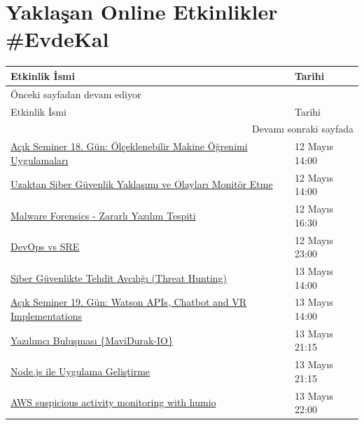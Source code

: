 \documentclass[11pt]{article}
\begin{document}
\section{Yaklaşan Online Etkinlikler \#EvdeKal}
\label{sec:org357459d}
\begin{longtable}{|p{9.5cm}|l|}
\hline
Etkinlik İsmi & Tarihi\\
\hline
\endfirsthead
\multicolumn{2}{l}{Önceki sayfadan devam ediyor} \\
\hline

Etkinlik İsmi & Tarihi \\

\hline
\endhead
\hline\multicolumn{2}{r}{Devamı sonraki sayfada} \\
\endfoot
\endlastfoot
\hline
\href{https://kommunity.com/tracikkaynak/events/acik-seminer-18-gun-olceklenebilir-makine-ogrenimi-uygulamalari-621dca47}{Açık Seminer 18. Gün: Ölçeklenebilir Makine Öğrenimi Uygulamaları} & 12 Mayıs 14:00\\
\href{https://kommunity.com/cozumpark/events/uzaktan-siber-guvenlik-yaklasimi-ve-olaylari-monitor-etme-c989475b}{Uzaktan Siber Güvenlik Yaklaşımı ve Olayları Monitör Etme} & 12 Mayıs 14:00\\
\href{https://kommunity.com/akademi/events/malware-forensics-zararli-yazilim-tespiti-webinar-dc4a41a9}{Malware Forensics - Zararlı Yazılım Tespiti} & 12 Mayıs 16:30\\
\href{https://kommunity.com/cloud-and-serverless-turkey/events/ramazan-ozel-6-devops-vs-sre-41220ba0}{DevOps vs SRE} & 12 Mayıs 23:00\\
\href{https://kommunity.com/cozumpark/events/siber-guvenlikte-tehdit-avciligi-threat-hunting-21ee4d23}{Siber Güvenlikte Tehdit Avcılığı (Threat Hunting)} & 13 Mayıs 14:00\\
\href{https://kommunity.com/tracikkaynak/events/acik-seminer-19-gun-watson-apis-chatbot-and-vr-implementations-68e687f7}{Açık Seminer 19. Gün: Watson APIs, Chatbot and VR Implementations} & 13 Mayıs 14:00\\
\href{https://kommunity.com/mavidurakio/events/s1e41-yazilimci-bulusmasi-52fe964f}{Yazılımcı Buluşması \{MaviDurak-IO\}} & 13 Mayıs 21:15\\
\href{https://kommunity.com/bilge-adam-teknoloji/events/nodejs-ile-uygulama-gelistirme-d4055b37}{Node.js ile Uygulama Geliştirme} & 13 Mayıs 21:15\\
\href{https://kommunity.com/devops-turkiye/events/aws-suspicious-activity-monitoring-with-humio-f70d68e0}{AWS suspicious activity monitoring with humio} & 13 Mayıs 22:00\\

\end{longtable}
\end{document}
